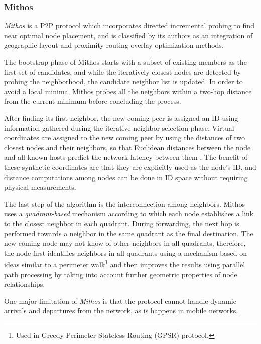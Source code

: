 \subsubsection{Mithos}
\emph{Mithos} \cite{WR2003} is a P2P protocol which incorporates directed
incremental probing to find near optimal node placement, and is classified by
its authors as an integration of geographic layout and proximity routing overlay
optimization methods.

The bootstrap phase of Mithos starts with a subset of existing members as the
first set of candidates, and while the iteratively closest nodes are detected by
probing the neighborhood, the candidate neighbor list is updated. In order to
avoid a local minima, Mithos probes all the neighbors within a two-hop distance
from the current minimum before concluding the process.

After finding its first neighbor, the new coming peer is assigned an ID using
information gathered during the iterative neighbor selection phase. Virtual
coordinates are assigned to the new coming peer by using the distances of two
closest nodes and their neighbors, so that Euclidean distances between the node
and all known hosts predict the network latency between them
\cite{cox_vivaldi_2004}. The benefit of these synthetic coordinates are that
they are explicitly used as the node's ID, and distance computations among nodes
can be done in ID space without requiring physical measurements.

The last step of the algorithm is the interconnection among neighbors. Mithos
uses a \emph{quadrant-based} mechanism according to which each node establishes
a link to the closest neighbor in each quadrant. During forwarding, the next
hop is performed towards a neighbor in the same quadrant as the final
destination. The new coming node may not know of other neighbors in all
quadrants, therefore, the node first identifies neighbors in all quadrants
using a mechanism based on ideas similar to a perimeter walk\footnote{Used in
Greedy Perimeter Stateless Routing (GPSR) protocol.} and then improves the
results using parallel path processing by taking into account further geometric
properties of node relationships.

One major limitation of \textit{Mithos} is that the protocol cannot handle
dynamic arrivals and departures from the network, as is happens in mobile
networks.

%
%

